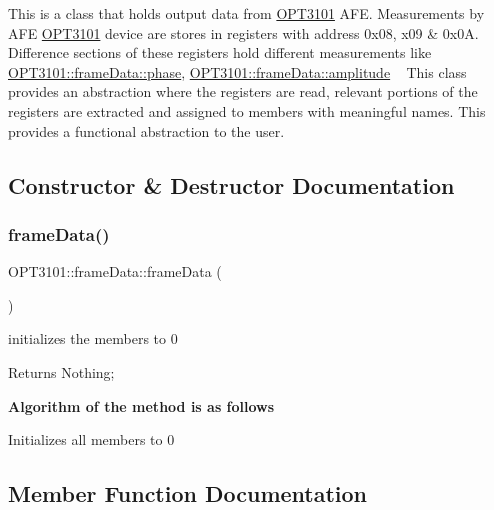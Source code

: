 This is a class that holds output data from \mbox{\hyperlink{namespace_o_p_t3101}{O\+P\+T3101}} A\+FE. Measurements by A\+FE \mbox{\hyperlink{namespace_o_p_t3101}{O\+P\+T3101}} device are stores in registers with address 0x08, x09 \& 0x0A. Difference sections of these registers hold different measurements like \mbox{\hyperlink{class_o_p_t3101_1_1frame_data_af8661d11405953dc378ad4d7cb0f2db6}{O\+P\+T3101\+::frame\+Data\+::phase}}, \mbox{\hyperlink{class_o_p_t3101_1_1frame_data_a16b903f0cea13dc66d751beab7271a18}{O\+P\+T3101\+::frame\+Data\+::amplitude}} ~\newline
 This class provides an abstraction where the registers are read, relevant portions of the registers are extracted and assigned to members with meaningful names. This provides a functional abstraction to the user. 

\subsection{Constructor \& Destructor Documentation}
\mbox{\label{class_o_p_t3101_1_1frame_data_a75a43907483d7d3b2db46cfb10bfd568}} 
\subsubsection{\texorpdfstring{frame\+Data()}{frameData()}}
{\footnotesize\ttfamily O\+P\+T3101\+::frame\+Data\+::frame\+Data (\begin{DoxyParamCaption}{ }\end{DoxyParamCaption})}



initializes the members to 0 

\begin{DoxyReturn}{Returns}
Nothing; 
\end{DoxyReturn}
{\bfseries Algorithm of the method is as follows}


\begin{DoxyItemize}
\item Initializes all members to 0 
\end{DoxyItemize}

\subsection{Member Function Documentation}
\mbox{\label{class_o_p_t3101_1_1frame_data_a0ea9d9f3fc2d25e28e77855f4db8e2a6}} 
